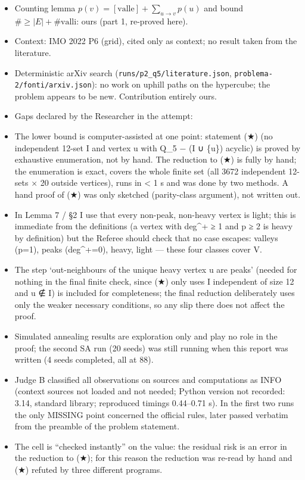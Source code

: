 \begin{itemize}
\tightlist
\item
  Counting lemma \(p(v)=[\text{valle}]+\sum_{u\to v}p(u)\) and bound
  \(\#\ge|E|+\#\text{valli}\): ours (part 1, re-proved here).
\item
  Context: IMO 2022 P6 (grid), cited only as context; no result taken
  from the literature.
\item
  Deterministic arXiv search (\texttt{runs/p2\_q5/literature.json},
  \texttt{problema-2/fonti/arxiv.json}): no work on uphill paths on the
  hypercube; the problem appears to be new. Contribution entirely ours.
\end{itemize}


\begin{itemize}
\tightlist
\item
  Gaps declared by the Researcher in the attempt:
\item
  The lower bound is computer-assisted at one point: statement (★) (no
  independent 12-set I and vertex u with Q\_5 − (I ∪ \{u\}) acyclic) is
  proved by exhaustive enumeration, not by hand. The reduction to (★) is
  fully by hand; the enumeration is exact, covers the whole finite set
  (all 3672 independent 12-sets × 20 outside vertices), runs in
  \textless{} 1 s and was done by two methods. A hand proof of (★) was
  only sketched (parity-class argument), not written out.
\item
  In Lemma 7 / §2 I use that every non-peak, non-heavy vertex is light;
  this is immediate from the definitions (a vertex with deg\^{}+ ≥ 1 and
  p ≥ 2 is heavy by definition) but the Referee should check that no
  case escapes: valleys (p=1), peaks (deg\^{}+=0), heavy, light ---
  these four classes cover V.
\item
  The step `out-neighbours of the unique heavy vertex u are peaks'
  (needed for nothing in the final finite check, since (★) only uses I
  independent of size 12 and u ∉ I) is included for completeness; the
  final reduction deliberately uses only the weaker necessary
  conditions, so any slip there does not affect the proof.
\item
  Simulated annealing results are exploration only and play no role in
  the proof; the second SA run (20 seeds) was still running when this
  report was written (4 seeds completed, all at 88).
\item
  Judge B classified all observations on sources and computations as
  INFO (context sources not loaded and not needed; Python version not
  recorded: 3.14, standard library; reproduced timings 0.44--0.71 s). In
  the first two runs the only MISSING point concerned the official
  rules, later passed verbatim from the preamble of the problem
  statement.
\item
  The cell is ``checked instantly'' on the value: the residual risk is
  an error in the reduction to (★); for this reason the reduction was
  re-read by hand and (★) refuted by three different programs.
\end{itemize}


